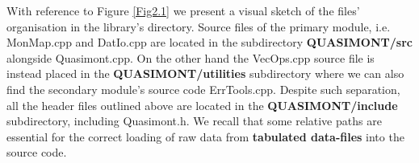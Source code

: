 \documentclass[a4paper, twosided]{book}
\begin{document}
\begin{itemize}
    \newpage
    \vspace{0.5cm}
\end{itemize}

\noindent
With reference to Figure \ref{Fig2.1} we present a visual sketch of the files' organisation in the library's directory. Source files of the primary module, i.e. \colorbox{poliGrayBlue}{MonMap.cpp} and \colorbox{poliGrayBlue}{DatIo.cpp} are located in the subdirectory \colorbox{poliGrayBlue}{\textbf{QUASIMONT/src}} alongside \colorbox{poliGrayBlue}{Quasimont.cpp}. On the other hand the \colorbox{poliGrayBlue}{VecOps.cpp} source file is instead placed in the \colorbox{poliGrayBlue}{\textbf{QUASIMONT/utilities}} subdirectory where we can also find the secondary module's source code \colorbox{poliGrayBlue}{ErrTools.cpp}. Despite such separation, all the header files outlined above are located in the \colorbox{poliGrayBlue}{\textbf{QUASIMONT/include}} subdirectory, including \colorbox{poliGrayBlue}{Quasimont.h}. We recall that some relative paths are essential for the correct loading of raw data from \color{poliDarkBlue} \textbf{tabulated data-files} \color{black} into the source code.
\end{document}
